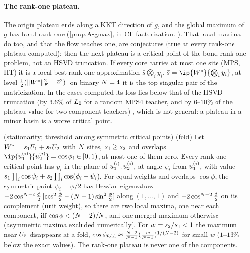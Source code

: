 \paragraph{The rank-one plateau.} \derived{} \newresult{} The origin plateau ends along a KKT direction of $g$,
and the global maximum of $g$ has bond rank one (\cref{prop:A-gmax}; in CP factorization:
\citealp{razin2021implicit}). That local maxima do too, and that
the flow reaches one, are conjectures (true at every rank-one plateau computed); then the next plateau is
a critical point of the bond-rank-one problem, not an HSVD truncation. If every core carries at most one
site (MPS, HT) it is a local best rank-one approximation $\bar s\bigotimes_iy_i$, $\bar s=\ip{\Wt}{\bigotimes_iy_i}$, at level
$\frac12(\lVert W^{*}\rVert_{F}^2-\bar s^2)$; on binary $N=4$ it is the top singular pair of the matricization. In the cases
computed its loss lies below that of the HSVD truncation (by $6.6\%$ of $L_0$ for a random MPS4 teacher, and by
$6$--$10\%$ of the plateau value for two-component teachers) \empirical, which is not general: a plateau in a minor
basin is a worse critical point.

\begin{proposition}\label{prop:A-two-components}
  \proven{} (stationarity; threshold among symmetric critical points) \derived{} (fold)
  \newresult[elementary] Let $W^{*}=s_{1}U_{1}+s_{2}U_{2}$ with $N$ sites, $s_{1}\ge s_{2}$ and overlaps
  $\ip{\fac1i}{\fac2i}=\cos\phi_i\in[0,1)$, at most one of them zero. Every rank-one critical point has $y_i$
  in the plane of $u_{1}^{(i)},u_{2}^{(i)}$, at angle $\psi_i$ from $u_{1}^{(i)}$, with value $s_{1}\prod_i\cos\psi_i+s_{2}\prod_i\cos(\phi_i-\psi_i)$.
  For equal weights and overlaps $\cos\phi$, the symmetric point $\psi_i=\phi/2$ has Hessian eigenvalues
  $-2\cos^{N-2}\frac\phi2\,[\cos^2\frac\phi2-(N-1)\sin^2\frac\phi2]$ along $(1,\dots,1)$ and $-2\cos^{N-2}\frac\phi2$ on
  its complement (unit weight), so there are two local maxima, one near each component, iff $\cos\phi<(N-2)/N$, and one merged
  maximum otherwise (asymmetric maxima excluded numerically). For $w=s_{2}/s_{1}<1$ the
  maximum near $U_{2}$ disappears at a fold, $\cos\phi_{\rm fold}\approx\frac{N-2}{N-1}(\frac{w}{N-1})^{1/(N-2)}$
  for small $w$ ($1$--$13\%$ below the exact values). The rank-one plateau is never one of the components.
\end{proposition}

